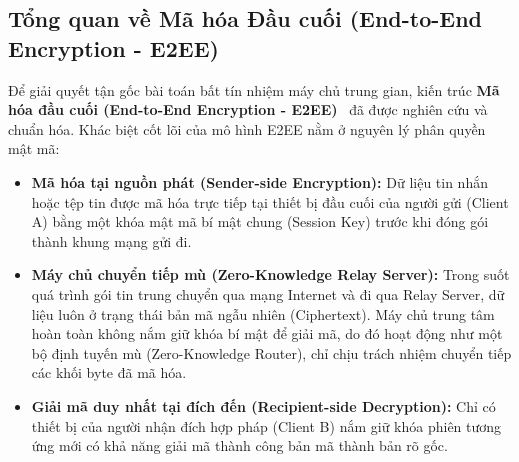 \documentclass[a4paper,12pt]{article}
\begin{document}
\subsection{Tổng quan về Mã hóa Đầu cuối (End-to-End Encryption - E2EE)}
Để giải quyết tận gốc bài toán bất tín nhiệm máy chủ trung gian, kiến trúc \textbf{Mã hóa đầu cuối (End-to-End Encryption - E2EE)}~\cite{signal_protocol} đã được nghiên cứu và chuẩn hóa. Khác biệt cốt lõi của mô hình E2EE nằm ở nguyên lý phân quyền mật mã:
\begin{itemize}
    \item \textbf{Mã hóa tại nguồn phát (Sender-side Encryption):} Dữ liệu tin nhắn hoặc tệp tin được mã hóa trực tiếp tại thiết bị đầu cuối của người gửi (Client A) bằng một khóa mật mã bí mật chung (Session Key) trước khi đóng gói thành khung mạng gửi đi.
    \item \textbf{Máy chủ chuyển tiếp mù (Zero-Knowledge Relay Server):} Trong suốt quá trình gói tin trung chuyển qua mạng Internet và đi qua Relay Server, dữ liệu luôn ở trạng thái bản mã ngẫu nhiên (Ciphertext). Máy chủ trung tâm hoàn toàn không nắm giữ khóa bí mật để giải mã, do đó hoạt động như một bộ định tuyến mù (Zero-Knowledge Router), chỉ chịu trách nhiệm chuyển tiếp các khối byte đã mã hóa.
    \item \textbf{Giải mã duy nhất tại đích đến (Recipient-side Decryption):} Chỉ có thiết bị của người nhận đích hợp pháp (Client B) nắm giữ khóa phiên tương ứng mới có khả năng giải mã thành công bản mã thành bản rõ gốc.
\end{itemize}
\end{document}

